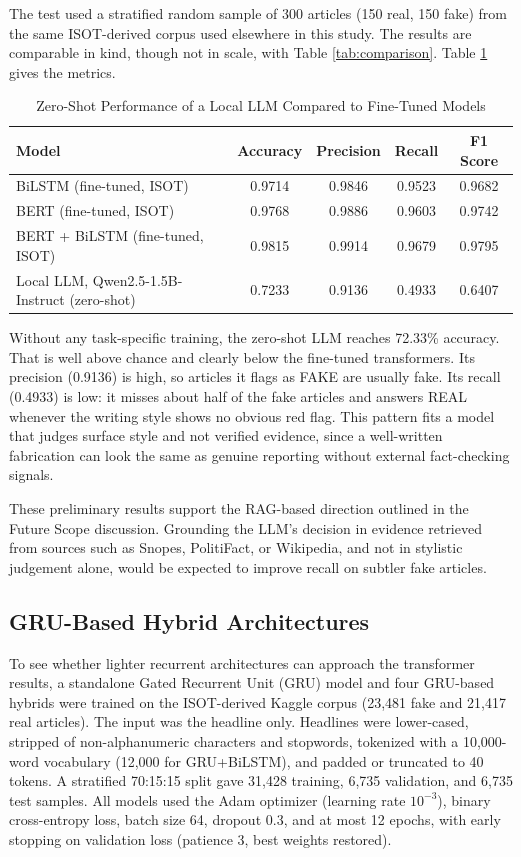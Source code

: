 The test used a stratified random sample of 300 articles (150 real, 150 fake) from the same ISOT-derived corpus \cite{ISOTDataset} used elsewhere in this study. The results are comparable in kind, though not in scale, with Table \ref{tab:comparison}. Table \ref{tab:llm-comparison} gives the metrics.

\begin{table}[H]
\centering
\caption{Zero-Shot Performance of a Local LLM Compared to Fine-Tuned Models}
\label{tab:llm-comparison}
\small
\begin{tabular}{|l|c|c|c|c|}
\hline
\textbf{Model} & \textbf{Accuracy} & \textbf{Precision} & \textbf{Recall} & \textbf{F1 Score} \\ \hline
BiLSTM (fine-tuned, ISOT) & 0.9714 & 0.9846 & 0.9523 & 0.9682 \\
BERT (fine-tuned, ISOT) & 0.9768 & 0.9886 & 0.9603 & 0.9742 \\
BERT + BiLSTM (fine-tuned, ISOT) & 0.9815 & 0.9914 & 0.9679 & 0.9795 \\
Local LLM, Qwen2.5-1.5B-Instruct (zero-shot) & 0.7233 & 0.9136 & 0.4933 & 0.6407 \\ \hline
\end{tabular}
\end{table}

Without any task-specific training, the zero-shot LLM reaches 72.33\% accuracy. That is well above chance and clearly below the fine-tuned transformers. Its precision (0.9136) is high, so articles it flags as FAKE are usually fake. Its recall (0.4933) is low: it misses about half of the fake articles and answers REAL whenever the writing style shows no obvious red flag. This pattern fits a model that judges surface style and not verified evidence, since a well-written fabrication can look the same as genuine reporting without external fact-checking signals.

These preliminary results support the RAG-based direction outlined in the Future Scope discussion. Grounding the LLM's decision in evidence retrieved from sources such as Snopes, PolitiFact, or Wikipedia, and not in stylistic judgement alone, would be expected to improve recall on subtler fake articles.

\subsection{GRU-Based Hybrid Architectures}

To see whether lighter recurrent architectures can approach the transformer results, a standalone Gated Recurrent Unit (GRU) model and four GRU-based hybrids were trained on the ISOT-derived Kaggle corpus (23,481 fake and 21,417 real articles). The input was the headline only. Headlines were lower-cased, stripped of non-alphanumeric characters and stopwords, tokenized with a 10,000-word vocabulary (12,000 for GRU+BiLSTM), and padded or truncated to 40 tokens. A stratified 70:15:15 split gave 31,428 training, 6,735 validation, and 6,735 test samples. All models used the Adam optimizer (learning rate $10^{-3}$), binary cross-entropy loss, batch size 64, dropout 0.3, and at most 12 epochs, with early stopping on validation loss (patience 3, best weights restored).

